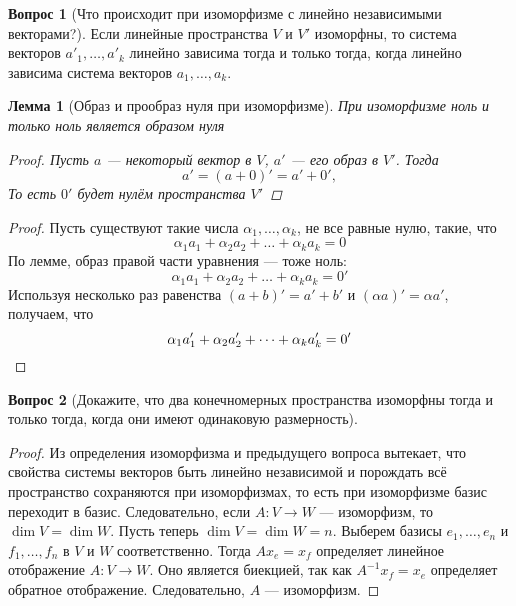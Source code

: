 \documentclass[a4paper,11pt]{article}
\newtheorem*{lemma}{Лемма}
\theoremstyle{remark}
\theoremstyle{definition}
\newtheorem{question}{Вопрос}
\numberwithin{question}{subsection}
\begin{document}
\begin{question}[Что происходит при изоморфизме с линейно независимыми векторами?]
Если линейные пространства \(V\) и \(V'\) изоморфны, то система векторов \(a'_1, \dots, a'_k\) линейно зависима тогда и только тогда, когда линейно зависима система векторов \(a_1, \dots, a_k\).
\begin{lemma}[Образ и прообраз нуля при изоморфизме]
При изоморфизме ноль и только ноль является образом нуля
\begin{proof}
Пусть \(a\) --- некоторый вектор в \(V\), \(a'\) --- его образ в \(V'\). Тогда
\begin{equation*}
	a' = (a + 0)' = a' + 0',
\end{equation*}
То есть \(0'\) будет нулём пространства \(V'\)
\end{proof}
\end{lemma}

\begin{proof}
Пусть существуют такие числа \(\alpha_1, \dots, \alpha_k\), не все равные нулю, такие, что
\begin{equation*}
	\alpha_1a_1 + \alpha_2a_2 + \dots + \alpha_ka_k = 0
\end{equation*}
По лемме, образ правой части уравнения --- тоже ноль:
\begin{equation*}
	\alpha_1a_1 + \alpha_2a_2 + \dots + \alpha_ka_k = 0'
\end{equation*}
Используя несколько раз равенства \((a + b)' = a' + b'\) и \((\alpha{}a)' = \alpha{}a'\), получаем, что
\begin{equation*}
	\alpha_1a'_1 + \alpha_2a'_2 + \dots + \alpha_ka'_k = 0' \qedhere
\end{equation*}
\end{proof}
\end{question}

\begin{question}[Докажите, что два конечномерных пространства изоморфны тогда и только тогда, когда они имеют одинаковую размерность]\(\)
\begin{proof}
Из определения изоморфизма и предыдущего вопроса вытекает, что свойства системы векторов быть линейно независимой и порождать всё пространство сохраняются при изоморфизмах, то есть при изоморфизме базис переходит в базис. Следовательно, если \(A: V \rightarrow W\) --- изоморфизм, то \(\dim V = \dim W\). Пусть теперь \(\dim V = \dim W = n\). Выберем базисы \(e_1, \dots, e_n\) и \(f_1, \dots, f_n\) в \(V\) и \(W\) соответственно. Тогда \(Ax_e = x_f\) определяет линейное отображение \(A: V \rightarrow W\). Оно является биекцией, так как \(A^{-1}x_f = x_e\) определяет обратное отображение. Следовательно, \(A\) --- изоморфизм. 
\end{proof}
\end{question}
\end{document}
